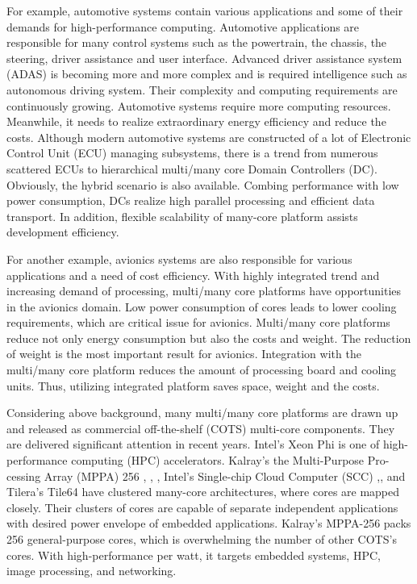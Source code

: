 \documentclass{sig-alternate-05-2015}
\begin{document}
For example, automotive systems contain various applications and some of their demands for high-performance computing.
Automotive applications are responsible for many control systems such as the powertrain, the chassis, the steering, driver assistance and user interface.
Advanced driver assistance system (ADAS) is becoming more and more complex and is required intelligence such as autonomous driving system.
Their complexity and computing requirements are continuously growing.
Automotive systems require more computing resources.
Meanwhile, it needs to realize extraordinary energy efficiency and reduce the costs.
Although modern automotive systems are constructed of a lot of Electronic Control Unit (ECU) managing subsystems,
there is a trend from numerous scattered ECUs to hierarchical multi/many core Domain Controllers (DC).
Obviously, the hybrid scenario is also available.
Combing performance with low power consumption, DCs realize high parallel processing and efficient data transport.
In addition, flexible scalability of many-core platform assists development efficiency.

For another example, avionics systems are also responsible for various applications and a need of cost efficiency.
With highly integrated trend and increasing demand of processing, multi/many core platforms have opportunities in the avionics domain.
Low power consumption of cores leads to lower cooling requirements, which are critical issue for avionics.
Multi/many core platforms reduce not only energy consumption but also the costs and weight.
The reduction of weight is the most important result for avionics.
Integration with the multi/many core platform reduces the amount of processing board and cooling units.
Thus, utilizing integrated platform saves space, weight and the costs.

Considering above background, many multi/many core platforms are drawn up and released as commercial off-the-shelf (COTS) multi-core components.
They are delivered significant attention in recent years.
Intel's Xeon Phi \cite{chrysos2014intel} \cite{chrysos2012intel} is one of high-performance computing (HPC) accelerators.
Kalray's the Multi-Purpose Pro-cessing Array (MPPA) 256 \cite{de2013distributed}, \cite{de2013clustered}, \cite{de2014time},
Intel's Single-chip Cloud Computer (SCC) \cite{intel2015scc},\cite{baron2010single}, and
Tilera's Tile64 \cite{tilera2015tile64} have clustered many-core architectures,
where cores are mapped closely.
Their clusters of cores are capable of separate independent applications with desired power envelope of embedded applications.
Kalray's MPPA-256 packs 256 general-purpose cores, which is overwhelming the number of other COTS's cores.
With high-performance per watt, it targets embedded systems, HPC, image processing, and networking.
\end{document}
